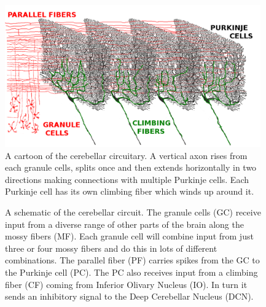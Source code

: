 \documentclass[11pt,a4paper]{scrartcl}
\begin{document}
\begin{figure}
\begin{center}
\includegraphics[width=11cm]{cerebellum.png}
\end{center}
\caption{A cartoon of the cerebellar circuitary. A vertical axon rises
  from each granule cells, splits once and then extends horizontally
  in two directions making connections with multiple Purkinje
  cells. Each Purkinje cell has its own climbing fiber which winds up
  around it.\label{fig:cerebellum}}
\end{figure}



\begin{figure}
\begin{center}
\end{center}
\caption{A schematic of the cerebellar circuit. The granule cells (GC) receive input from a diverse range of other parts of the brain along the mossy fibers (MF). Each granule cell will combine input from just three or four mossy fibers and do this in lots of different combinations. The parallel fiber (PF) carries spikes from the GC to the Purkinje cell (PC). The PC also receives input from a climbing fiber (CF) coming from Inferior Olivary Nucleus (IO). In turn it sends an inhibitory signal to the Deep Cerebellar Nucleus (DCN).\label{fig:connectivity}}
\end{figure}
\end{document}
